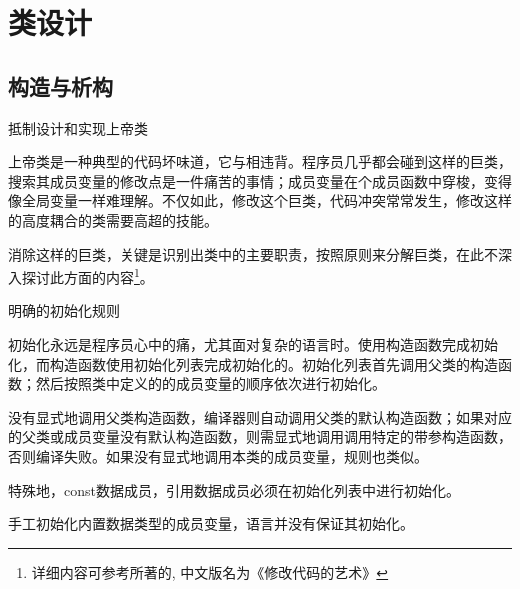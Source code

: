 \begin{savequote}[45mm]
\end{savequote}

\chapter{类设计}
\label{ch:class-design}

\section{构造与析构}

\begin{content}

\begin{regulation}
抵制设计和实现上帝类
\end{regulation}

上帝类是一种典型的代码坏味道，它与相违背。程序员几乎都会碰到这样的巨类，搜索其成员变量的修改点是一件痛苦的事情；成员变量在个成员函数中穿梭，变得像全局变量一样难理解。不仅如此，修改这个巨类，代码冲突常常发生，修改这样的高度耦合的类需要高超的技能。

消除这样的巨类，关键是识别出类中的主要职责，按照原则来分解巨类，在此不深入探讨此方面的内容\footnote{详细内容可参考所著的, 中文版名为《修改代码的艺术》}。

\begin{regulation}
明确\cpp{}的初始化规则
\end{regulation}

初始化永远是程序员心中的痛，尤其面对复杂的\cpp{}语言时。\cpp{}使用构造函数完成初始化，而构造函数使用初始化列表完成初始化的。初始化列表首先调用父类的构造函数；然后按照类中定义的的成员变量的顺序依次进行初始化。

没有显式地调用父类构造函数，编译器则自动调用父类的默认构造函数；如果对应的父类或成员变量没有默认构造函数，则需显式地调用调用特定的带参构造函数，否则编译失败。如果没有显式地调用本类的成员变量，规则也类似。

特殊地，const数据成员，引用数据成员必须在初始化列表中进行初始化。

\begin{regulation}
手工初始化内置数据类型的成员变量，\cpp{}语言并没有保证其初始化。
\end{regulation}


\end{content}
